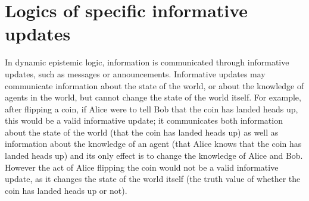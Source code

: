 


\section{Logics of specific informative updates}

In dynamic epistemic logic, information is communicated through informative
updates, such as messages or announcements. Informative updates may communicate
information about the state of the world, or about the knowledge of agents in
the world, but cannot change the state of the world itself. For example, after
flipping a coin, if Alice were to tell Bob that the coin has landed heads up,
this would be a valid informative update; it communicates both information about
the state of the world (that the coin has landed heads up) as well as
information about the knowledge of an agent (that Alice knows that the coin has
landed heads up) and its only effect is to change the knowledge of Alice and
Bob. However the act of Alice flipping the coin would not be a valid informative
update, as it changes the state of the world itself (the truth value of whether
the coin has landed heads up or not).

